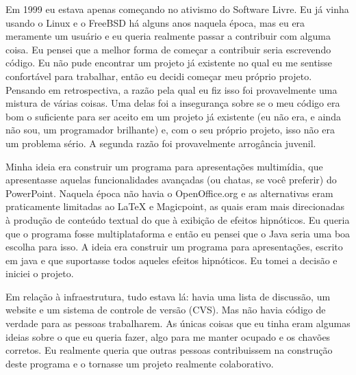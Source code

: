 

\noindent{}Em 1999 eu estava apenas começando no ativismo do Software Livre.
Eu já vinha usando o Linux e o FreeBSD há alguns anos naquela época, mas
eu era meramente um usuário e eu queria realmente passar a contribuir com
alguma coisa. Eu pensei que a melhor forma de começar a contribuir seria escrevendo
código. Eu não pude encontrar um projeto já existente no qual eu me sentisse
confortável para trabalhar, então eu decidi começar meu próprio projeto. Pensando
em retrospectiva, a razão pela qual eu fiz isso foi provavelmente uma mistura de
várias coisas. Uma delas foi a insegurança sobre se o meu código era bom o
suficiente para ser aceito em um projeto já existente (eu não era, e ainda não
sou, um programador brilhante) e, com o seu próprio projeto, isso não era um
problema sério. A segunda razão foi provavelmente arrogância juvenil.

Minha ideia era construir um programa para apresentações multimídia, que apresentasse
aquelas funcionalidades avançadas (ou chatas, se você preferir) do PowerPoint.
Naquela época não havia o OpenOffice.org e as alternativas eram praticamente
limitadas ao LaTeX e Magicpoint, as quais eram mais direcionadas à produção de
conteúdo textual do que à exibição de efeitos hipnóticos. Eu queria que o programa
fosse multiplataforma e então eu pensei que o Java seria uma boa escolha para isso.
A ideia era construir um programa para apresentações, escrito em java e que suportasse
todos aqueles efeitos hipnóticos. Eu tomei a decisão e iniciei o projeto.

Em relação à infraestrutura, tudo estava lá: havia uma lista de discussão,
um website e um sistema de controle de versão (CVS). Mas não havia código de verdade
para as pessoas trabalharem. As únicas coisas que eu tinha eram algumas ideias sobre o
que eu queria fazer, algo para me manter ocupado e os chavões corretos. Eu realmente
queria que outras pessoas contribuissem na construção deste programa e o tornasse um
projeto realmente colaborativo.

